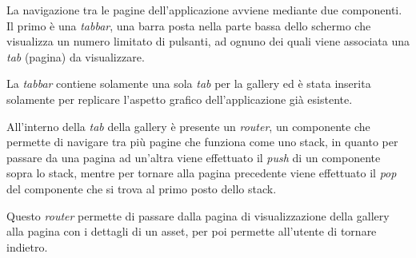 La navigazione tra le pagine dell'applicazione avviene mediante due componenti.
Il primo è una \textit{tabbar}, una barra posta nella parte bassa dello schermo che visualizza un numero limitato di pulsanti, ad ognuno dei quali viene associata una \textit{tab} (pagina) da visualizzare. 

La \textit{tabbar} contiene solamente una sola \textit{tab} per la gallery ed è stata inserita solamente per replicare l'aspetto grafico dell'applicazione già esistente.

All'interno della \textit{tab} della gallery è presente un \textit{router}, un componente che permette di navigare tra più pagine che funziona come uno stack, in quanto per passare da una pagina ad un'altra viene effettuato il \textit{push} di un componente sopra lo stack, mentre per tornare alla pagina precedente viene effettuato il \textit{pop} del componente che si trova al primo posto dello stack.

Questo \textit{router} permette di passare dalla pagina di visualizzazione della gallery alla pagina con i dettagli di un asset, per poi permette all'utente di tornare indietro.


